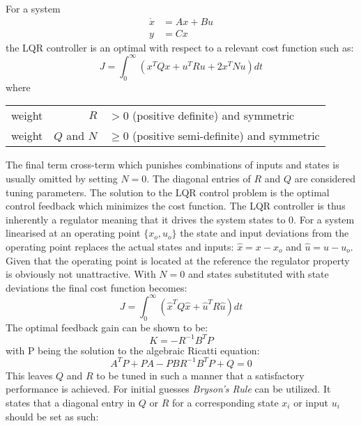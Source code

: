 For a system
\begin{equation}\label{eq:ctrl_sys}
	\begin{split}
		\dot x &= A x + B u \\
		y &= Cx
	\end{split}
\end{equation}
the LQR controller is an optimal with respect to a relevant cost function such as:
\begin{equation}\label{eq:lqr_cost}
	J = \int_{0}^{\infty} \left(x^T Q x + u^T R u + 2x^T N u\right) dt
\end{equation}
where
\begin{center}
	\begin{tabular}{l r l }
		weight & $R$         & $ > 0$ (positive definite) and symmetric       \\
		weight & $Q$ and $N$ & $\ge 0$ (positive semi-definite) and symmetric
	\end{tabular}
\end{center}
\smallskip
The final term cross-term which punishes combinations of inputs and states is usually omitted by setting $ N = 0 $. The diagonal entries of $ R $ and $ Q $ are considered tuning parameters. The solution to the LQR control problem is the optimal control feedback which minimizes the cost function. The LQR controller is thus inherently a regulator meaning that it drives the system states to 0. For a system linearised at an operating point $ \{x_o, u_o\} $ the state and input deviations from the operating point replaces the actual states and inputs: $ \hat x = x-x_o $ and $ \hat u = u-u_o $. Given that the operating point is located at the reference the regulator property is obviously not unattractive. With $ N = 0 $ and states substituted with state deviations the final cost function becomes:
\begin{equation}\label{eq:lqr_cost_final}
	J = \int_{0}^{\infty} \left(\hat x^T Q \hat x + \hat u^T R \hat u\right) dt
\end{equation}
The optimal feedback gain can be shown to be: 
\begin{equation}\label{eq:lqr_K}
	K = -R^{-1} B^T P
\end{equation}
with P being the solution to the algebraic Ricatti equation:
\begin{equation}\label{lqr:ricatti}
	A^T P + P A - P B R^{-1} B^T P + Q = 0
\end{equation}
This leaves $ Q $ and $ R $ to be tuned in such a manner that a satisfactory performance is achieved. For initial guesses \textit{Bryson's Rule} can be utilized. It states that a diagonal entry in $ Q $ or $ R $ for a corresponding state $ x_i $ or input $ u_i $ should be set as such:
